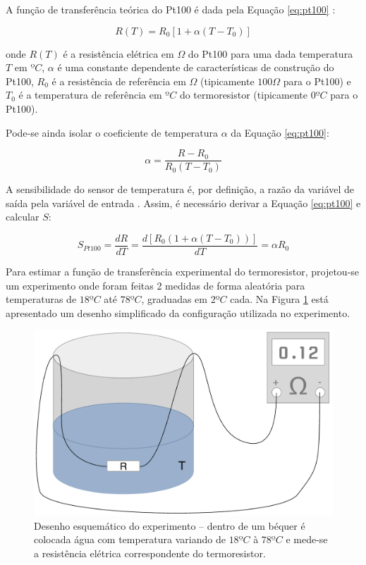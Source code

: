 \documentclass[a4paper]{instrumentacao}
\begin{document}
A função de transferência teórica do Pt100 é dada pela Equação \ref{eq:pt100} \cite{livro-texto}:

\begin{equation}
	R(T) = R_0 \left[1 + \alpha\left(T - T_0\right)\right]
	\label{eq:pt100}
\end{equation}

\noindent
onde $R(T)$ é a resistência elétrica em $\Omega$ do Pt100 para uma dada temperatura $T$ em $ºC$, $\alpha$ é uma constante dependente de características de construção do Pt100, $R_0$ é a resistência de referência em $\Omega$ (tipicamente $100 \Omega$ para o Pt100) e $T_0$ é a temperatura de referência em $ºC$ do termoresistor (tipicamente $0ºC$ para o Pt100).

Pode-se ainda isolar o coeficiente de temperatura $\alpha$ da Equação \ref{eq:pt100}:

\begin{equation}
	\alpha=\frac{R-R_0}{R_0(T-T_0)}
	\label{eq:pt100-alpha}
\end{equation}

A sensibilidade do sensor  de temperatura é, por definição, a razão da variável de saída pela variável de entrada \cite{livro-texto}. Assim, é necessário derivar a Equação \ref{eq:pt100} e calcular $S$:

\begin{equation}
	S_{Pt100}=\frac{dR}{dT}=\frac{d[R_0(1+\alpha(T-T_0))]}{dT}=\alpha R_0
	\label{eq:pt100-sensibilidade}
\end{equation}

Para estimar a função de transferência experimental do termoresistor, projetou-se um experimento onde foram feitas 2 medidas de forma aleatória para temperaturas de $18ºC$ até $78ºC$, graduadas em $2ºC$ cada. Na Figura \ref{fig:pt100-esquematico} está apresentado um desenho simplificado da configuração utilizada no experimento.

\begin{figure}[H]
\center
\includegraphics[width=\textwidth]{Bequer.pdf}
\caption{Desenho esquemático do experimento -- dentro de um béquer é colocada água com temperatura variando de $18ºC$ à $78ºC$ e mede-se a resistência elétrica correspondente do termoresistor.}
\label{fig:pt100-esquematico}
\end{figure}
\end{document}
